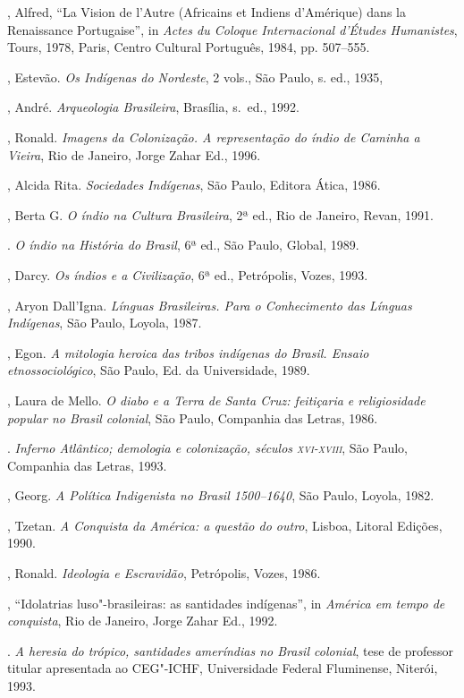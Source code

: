 \begin{bibliohedra}
, Alfred, ``La Vision de l'Autre (Africains et Indiens
d'Amérique) dans la Renaissance Portugaise'', in \textit{Actes du
Coloque Internacional d'Études Humanistes}, Tours, 1978, Paris, Centro
Cultural Português, 1984, pp. 507--555. 

, Estevão. \textit{Os Indígenas do Nordeste}, 2 vols.,
São Paulo, s. ed., 1935,

, André. \textit{Arqueologia Brasileira}, Brasília, s.~ed., 1992.

, Ronald. \textit{Imagens da Colonização. A representação do
índio de Caminha a Vieira}, Rio de Janeiro, Jorge Zahar Ed.,
1996. 

, Alcida Rita. \textit{Sociedades Indígenas}, São Paulo, Editora
Ática, 1986.

, Berta G. \textit{O índio na Cultura Brasileira}, 2ª ed., Rio
de Janeiro, Revan, 1991.

\titidem. \textit{O índio na História do Brasil}, 6ª ed., São
Paulo, Global, 1989.

, Darcy. \textit{Os índios e a Civilização}, 6ª ed.,
Petrópolis, Vozes, 1993.

, Aryon Dall'Igna. \textit{Línguas Brasileiras. Para o
Conhecimento das Línguas Indígenas}, São Paulo, Loyola, 1987.

, Egon. \textit{A mitologia heroica das tribos indígenas do
Brasil. Ensaio etnossociológico}, São Paulo, Ed. da Universidade, 1989.

, Laura de Mello. \textit{O diabo e a Terra de Santa Cruz:
feitiçaria e religiosidade popular no Brasil colonial}, São Paulo,
Companhia das Letras, 1986.

\titidem. \textit{Inferno Atlântico; demologia e
colonização, séculos \textsc{xvi}-\textsc{xviii}}, São Paulo, Companhia das Letras, 1993.

, Georg. \textit{A Política Indigenista no Brasil 1500--1640}, 
São Paulo, Loyola, 1982.

, Tzetan. \textit{A Conquista da América: a questão do outro}, 
Lisboa, Litoral Edições, 1990.

, Ronald. \textit{Ideologia e Escravidão}, Petrópolis, Vozes,
1986.

\titidem, ``Idolatrias luso"-brasileiras: as santidades
indígenas'', in \textit{América em tempo de conquista}, Rio de Janeiro,
Jorge Zahar Ed., 1992.

\titidem. \textit{A heresia do trópico, santidades ameríndias
no Brasil colonial}, tese de professor titular apresentada ao CEG"-ICHF,
Universidade Federal Fluminense, Niterói, 1993.
\end{bibliohedra}
 
